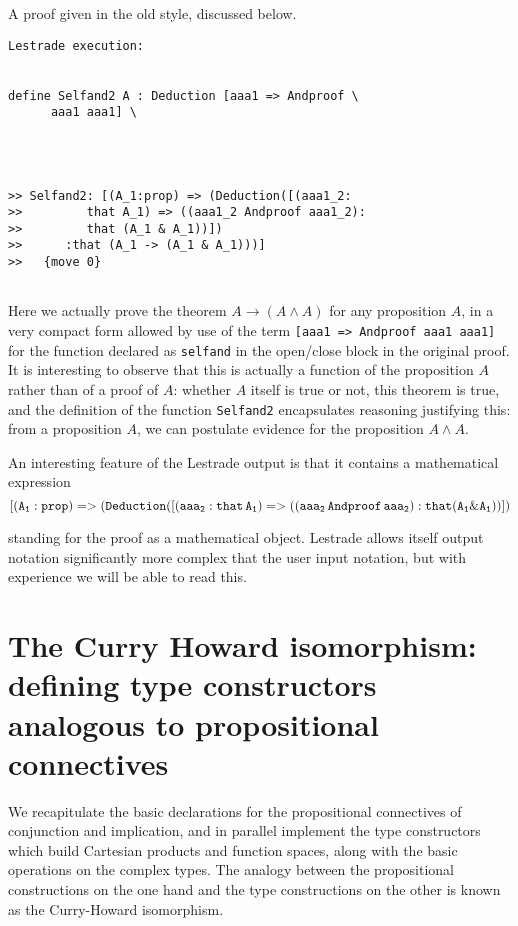 \documentclass[12pt]{article}
\begin{document}
A proof given in the old style, discussed below.

\begin{verbatim}Lestrade execution:


define Selfand2 A : Deduction [aaa1 => Andproof \
      aaa1 aaa1] \
   



>> Selfand2: [(A_1:prop) => (Deduction([(aaa1_2:
>>         that A_1) => ((aaa1_2 Andproof aaa1_2):
>>         that (A_1 & A_1))])
>>      :that (A_1 -> (A_1 & A_1)))]
>>   {move 0}


\end{verbatim}

Here we actually prove the theorem $A \rightarrow (A \wedge A)$ for any proposition $A$, in a very compact form allowed by use of the term {\tt [aaa1 => Andproof aaa1 aaa1]} for the function declared as {\tt selfand} in the open/close block in the original proof.   It is interesting to observe that this is actually a function of the proposition $A$ rather than of a proof of $A$:  whether $A$ itself is true or not, this theorem is true, and the definition of the function {\tt Selfand2} encapsulates reasoning justifying this:  from a proposition $A$, we can postulate evidence for the proposition $A \wedge A$.

An interesting feature of the Lestrade output is that it contains a mathematical expression $${\tt [(A_1:prop) => (Deduction([(aaa_2: that \,A_1) => ((aaa_2 \,Andproof\, aaa_2): that (A_1 \& A_1))])}$$

standing for the proof as a mathematical object.  Lestrade allows itself output notation significantly more complex that the user input notation, but with experience we will be able to read this.

\newpage

\section{The Curry Howard isomorphism:  defining type constructors analogous to propositional connectives}

We recapitulate the basic declarations for the propositional connectives of conjunction and implication, and in parallel implement the type constructors which build Cartesian products and function spaces, along with the basic operations on the complex types.  The analogy between the propositional constructions on the one hand and the type constructions on the other is known as the Curry-Howard isomorphism.
\end{document}
